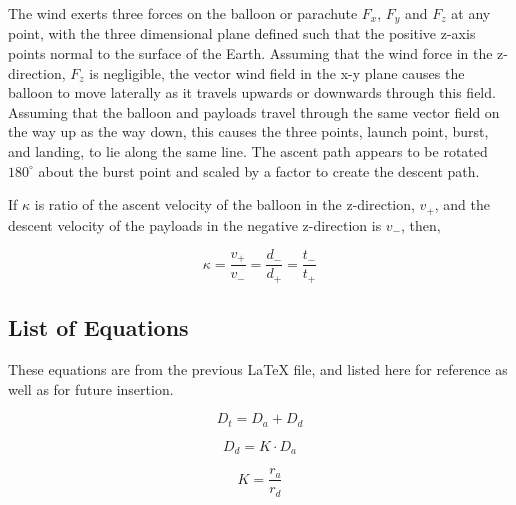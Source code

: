 \documentclass[useAMS,usenatbib]{mn2e}
\newcommand{\f}[2]{\frac{#1}{#2}}
\begin{document}
The wind exerts three forces on the balloon or parachute $F_x$, $F_y$ and $F_z$ at any point, with the three dimensional plane defined such that the positive z-axis points normal to the surface of the Earth. Assuming that the wind force in the z-direction, $F_z$ is negligible, the vector wind field in the x-y plane causes the balloon to move laterally as it travels upwards or downwards through this field. Assuming that the balloon and payloads travel through the same vector field on the way up as the way down, this causes the three points,
launch point, burst, and landing, to lie along the same line. The ascent path appears to be rotated $180 ^\circ$ about the burst point and scaled by a factor to create the descent path.



If $\kappa$ is ratio of the ascent velocity of the balloon in the z-direction, $v_+$,  and the descent velocity of the payloads in the negative z-direction is $v_-$, then,

\begin{equation}
\kappa = \f{v_+}{v_-} = \f{d_-}{d_+} = \f{t_-}{t_+}
\label{Mandm}
\end{equation}


\subsection{List of Equations}
These equations are from the previous LaTeX file, and listed here for reference as well as for future insertion.

\begin{equation}
D_{t} = D_{a}+D_{d}
\end{equation}

\begin{equation}
D_{d} = K \cdot D_{a}
\end{equation}

\begin{equation}
K = \frac{r_{a}}{r_{d}}
\end{equation}
\end{document}
